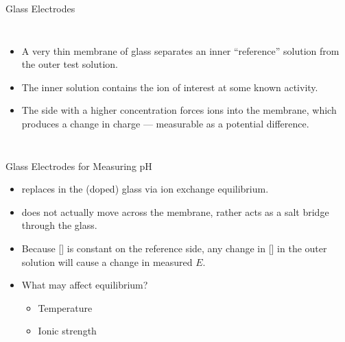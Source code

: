 \documentclass[notes=only]{beamer}
\begin{document}
\begin{frame}[allowframebreaks]{Glass Electrodes}
	\begin{columns}
	\begin{itemize}
		\item A very thin membrane of glass separates an
			inner ``reference'' solution from the
			outer test solution.
		\item The inner solution contains the ion of interest at some
			\alert{known} activity.
		\item The side with a higher concentration
			forces ions into the membrane, which
			produces a change in charge ---
			measurable as a potential difference.
	\end{itemize}
	\end{columns}
\end{frame}

\begin{frame}{Glass Electrodes for Measuring pH}
	\begin{itemize}
		\item {} replaces  in the (doped) glass via
			\alert{ion exchange equilibrium}.
		\item {} does not actually move across the membrane, rather
			 acts as a salt bridge through the glass.
		\item Because [] is constant on the reference side, any
			change in [] in the outer solution will cause a
			change in measured $E$.

			\bigskip

		\item What may affect equilibrium?
			\begin{itemize}
				\item<2-> Temperature
				\item<2-> Ionic strength
			\end{itemize}
	\end{itemize}
\end{frame}
\end{document}
